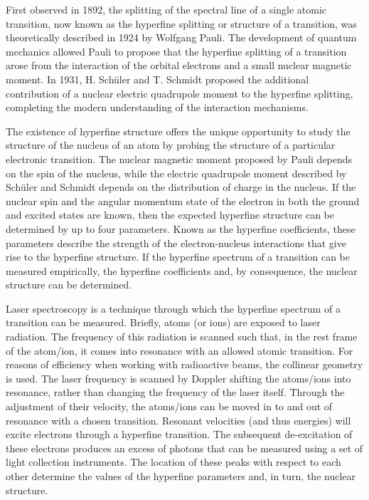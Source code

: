 \noindent First observed in 1892\citep{michelson}, the splitting of the spectral line of a single atomic transition, now known as the hyperfine splitting or structure of a transition, was theoretically described in 1924 by Wolfgang Pauli\citep{Pauli1924}. The development of quantum mechanics allowed Pauli to propose that the hyperfine splitting of a transition arose from the interaction of the orbital electrons and a small nuclear magnetic moment. In 1931, H. Schüler and T. Schmidt proposed the additional contribution of a nuclear electric quadrupole moment to the hyperfine splitting, completing the modern understanding of the interaction mechanisms\citep{Lieb2001}.

The existence of hyperfine structure offers the unique opportunity to study the structure of the nucleus of an atom by probing the structure of a particular electronic transition. The nuclear magnetic moment proposed by Pauli depends on the spin of the nucleus, while the electric quadrupole moment described by Schüler and Schmidt depends on the distribution of charge in the nucleus. If the nuclear spin and the angular momentum state of the electron in both the ground and excited states are known, then the expected hyperfine structure can be determined by up to four parameters. Known as the hyperfine coefficients, these parameters describe the strength of the electron-nucleus interactions that give rise to the hyperfine structure. If the hyperfine spectrum of a transition can be measured empirically, the hyperfine coefficients and, by consequence, the nuclear structure can be determined. 

Laser spectroscopy is a technique through which the hyperfine spectrum of a transition can be measured. Briefly, atoms (or ions) are exposed to laser radiation. The frequency of this radiation is scanned such that, in the rest frame of the atom/ion, it comes into resonance with an allowed atomic transition. For reasons of efficiency when working with radioactive beams, the collinear geometry is used. The laser frequency is scanned by Doppler shifting the atoms/ions into resonance, rather than changing the frequency of the laser itself. Through the adjustment of their velocity, the atoms/ions can be moved in to and out of resonance with a chosen transition. Resonant velocities (and thus energies) will excite electrons through a hyperfine transition. The subsequent de-excitation of these electrons produces an excess of photons that can be measured using a set of light collection instruments. The location of these peaks with respect to each other determine the values of the hyperfine parameters and, in turn, the nuclear structure. 


